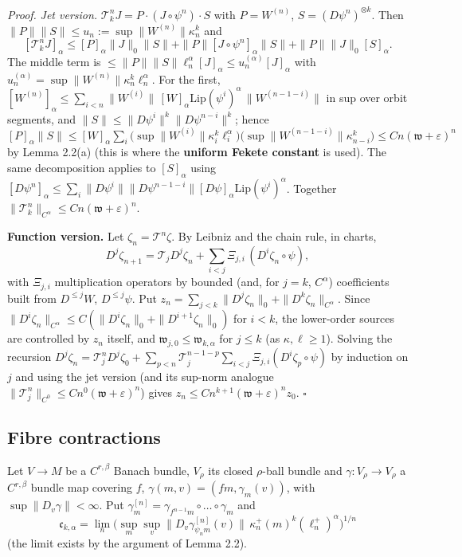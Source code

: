 \documentclass[11pt,a4paper]{article}
\theoremstyle{plain}
\theoremstyle{definition}
\theoremstyle{remark}
\numberwithin{equation}{section}
\numberwithin{figure}{section}
\begin{document}
\textit{Proof.} \textit{Jet version.} $\mathcal T^n_kJ=P\cdot(J\circ\psi^n)\cdot S$ with $P=W^{(n)}$, $S=(D\psi^n)^{\otimes k}$. Then $\|P\|\|S\|\le u_n:=\sup\|W^{(n)}\|\kappa_n^k$ and
\[
[\mathcal T_k^nJ]_\alpha\le[P]_\alpha\|J\|_0\|S\|+\|P\|[J\circ\psi^n]_\alpha\|S\|+\|P\|\|J\|_0[S]_\alpha .
\]
The middle term is $\le\|P\|\|S\|\ell_n^\alpha[J]_\alpha\le u_n^{(\alpha)}[J]_\alpha$ with $u_n^{(\alpha)}=\sup\|W^{(n)}\|\kappa_n^k\ell_n^\alpha$. For the first, $[W^{(n)}]_\alpha\le\sum_{i<n}\|W^{(i)}\|\,[W]_\alpha\mathrm{Lip}(\psi^i)^\alpha\,\|W^{(n-1-i)}\|$ in sup over orbit segments, and $\|S\|\le\|D\psi^i\|^k\|D\psi^{n-i}\|^k$; hence $[P]_\alpha\|S\|\le[W]_\alpha\sum_i\big(\sup\|W^{(i)}\|\kappa_i^k\ell_i^\alpha\big)\big(\sup\|W^{(n-1-i)}\|\kappa^k_{n-i}\big)\le Cn(\mathfrak w+\varepsilon)^n$ by Lemma 2.2(a) (this is where the \textbf{uniform Fekete constant} is used). The same decomposition applies to $[S]_\alpha$ using $[D\psi^n]_\alpha\le\sum_i\|D\psi^i\|\|D\psi^{n-1-i}\|[D\psi]_\alpha\mathrm{Lip}(\psi^i)^\alpha$. Together $\|\mathcal T_k^n\|_{C^\alpha}\le Cn(\mathfrak w+\varepsilon)^n$.

\textbf{Function version.} Let $\zeta_n=\mathcal T^n\zeta$. By Leibniz and the chain rule, in charts,
\[
D^j\zeta_{n+1}=\mathcal T_jD^j\zeta_n+\sum_{i<j}\Xi_{j,i}\,(D^i\zeta_n\circ\psi),
\]
with $\Xi_{j,i}$ multiplication operators by bounded (and, for $j=k$, $C^\alpha$) coefficients built from $D^{\le j}W$, $D^{\le j}\psi$. Put $z_n=\sum_{j<k}\|D^j\zeta_n\|_0+\|D^k\zeta_n\|_{C^\alpha}$. Since $\|D^i\zeta_n\|_{C^\alpha}\le C(\|D^i\zeta_n\|_0+\|D^{i+1}\zeta_n\|_0)$ for $i<k$, the lower-order sources are controlled by $z_n$ itself, and $\mathfrak w_{j,0}\le\mathfrak w_{k,\alpha}$ for $j\le k$ (as $\kappa,\ell\ge1$). Solving the recursion $D^j\zeta_n=\mathcal T_j^nD^j\zeta_0+\sum_{p<n}\mathcal T_j^{n-1-p}\sum_{i<j}\Xi_{j,i}(D^i\zeta_p\circ\psi)$ by induction on $j$ and using the jet version (and its sup-norm analogue $\|\mathcal T^n_j\|_{C^0}\le Cn^0(\mathfrak w+\varepsilon)^n$) gives $z_n\le Cn^{k+1}(\mathfrak w+\varepsilon)^nz_0$. $\square$

\subsection{Fibre contractions}

Let $V\to M$ be a $C^{r,\beta}$ Banach bundle, $V_\rho$ its closed $\rho$-ball bundle and $\gamma:V_\rho\to V_\rho$ a $C^{r,\beta}$ bundle map covering $f$, $\gamma(m,v)=(fm,\gamma_m(v))$, with $\sup\|D_v\gamma\|<\infty$. Put $\gamma^{[n]}_m=\gamma_{f^{n-1}m}\circ\dots\circ\gamma_m$ and
\[
\mathfrak c_{k,\alpha}=\lim_n\Big(\sup_{m}\sup_{v}\|D_v\gamma^{[n]}_{\psi_nm}(v)\|\,\kappa^+_n(m)^k(\ell^+_n)^\alpha\Big)^{1/n}
\]
(the limit exists by the argument of Lemma 2.2).
\end{document}

